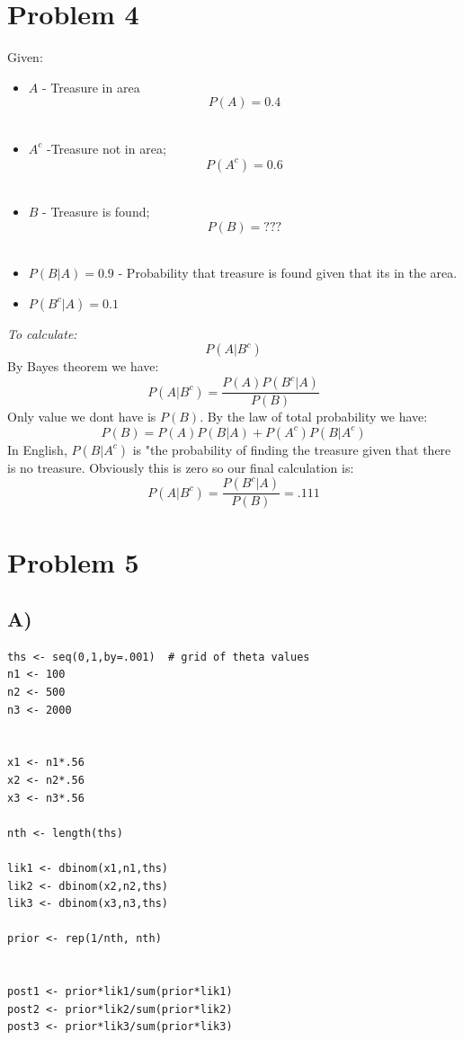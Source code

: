 \documentclass[11pt]{article}
\begin{document}
\section*{Problem 4}
\label{sec:org94d2ac4}
Given:\\
\begin{itemize}
\item \(A\) - Treasure in area $$P(A) = 0.4$$\\
\item \(A^{c}\) -Treasure not in area; $$P(A^{c}) = 0.6$$\\
\item \(B\) - Treasure is found; $$P(B) = ???$$\\
\item \(P(B|A)  = 0.9\) - Probability that treasure is found given that its in the area.\\
\item \(P(B^{c}|A) = 0.1\)
\end{itemize}
\emph{To calculate:} $$P(A|B^{c})$$
By Bayes theorem we have: $$P(A|B^{c}) = \frac{P(A)P(B^{c}|A)}{P(B)}$$
Only value we dont have is \(P(B)\). By the law of total probability we have:
$$P(B) = P(A)P(B|A) + P(A^{c} )P(B|A^{c})$$
In English, \(P(B|A^{c})\) is "the probability of finding the treasure given that there is no treasure. Obviously this is zero so our final calculation is:
$$P(A|B^{c}) = \frac{P(B^{c}|A)}{P(B)} = .111$$

\section*{Problem 5}
\label{sec:orge28049a}


\subsection*{A)}
\label{sec:org5eb37ed}
\begin{verbatim}
ths <- seq(0,1,by=.001)  # grid of theta values
n1 <- 100 
n2 <- 500 
n3 <- 2000 


x1 <- n1*.56
x2 <- n2*.56
x3 <- n3*.56

nth <- length(ths)

lik1 <- dbinom(x1,n1,ths)
lik2 <- dbinom(x2,n2,ths)
lik3 <- dbinom(x3,n3,ths)

prior <- rep(1/nth, nth)


post1 <- prior*lik1/sum(prior*lik1)
post2 <- prior*lik2/sum(prior*lik2)
post3 <- prior*lik3/sum(prior*lik3)
\end{verbatim}
\end{document}
